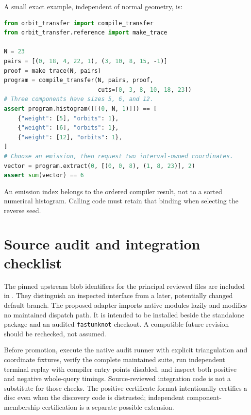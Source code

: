 \documentclass[11pt]{article}
\theoremstyle{definition}\newtheorem{definition}[theorem]{Definition}
\theoremstyle{remark}\newtheorem{remark}[theorem]{Remark}
\begin{document}
A small exact example, independent of normal geometry, is:
\begin{lstlisting}[language=Python]
from orbit_transfer import compile_transfer
from orbit_transfer.reference import make_trace

N = 23
pairs = [(0, 18, 4, 22, 1), (3, 10, 8, 15, -1)]
proof = make_trace(N, pairs)
program = compile_transfer(N, pairs, proof,
                           cuts=[0, 3, 8, 10, 18, 23])
# Three components have sizes 5, 6, and 12.
assert program.histogram([[(0, N, 1)]]) == [
    {"weight": [5], "orbits": 1},
    {"weight": [6], "orbits": 1},
    {"weight": [12], "orbits": 1},
]
# Choose an emission, then request two interval-owned coordinates.
vector = program.extract(0, [(0, 0, 8), (1, 8, 23)], 2)
assert sum(vector) == 6
\end{lstlisting}
An emission index belongs to the ordered compiler result, not to a sorted
numerical histogram. Calling code must retain that binding when selecting the
reverse seed.

\section{Source audit and integration checklist}
The pinned upstream blob identifiers for the principal reviewed files are
included in . They distinguish an inspected interface from
a later, potentially changed default branch. The proposed adapter imports
native modules lazily and modifies no maintained dispatch path. It is intended
to be installed beside the standalone package and an audited \texttt{fastunknot}
checkout. A compatible future revision should be rechecked, not assumed.

Before promotion, execute the native audit runner with explicit triangulation
and coordinate fixtures, verify the complete maintained suite, run independent
terminal replay with compiler entry points disabled, and inspect both positive
and negative whole-query timings. Source-reviewed integration code is not a
substitute for those checks. The positive certificate format intentionally
certifies a disc even when the discovery code is distrusted; independent
component-membership certification is a separate possible extension.
\end{document}
